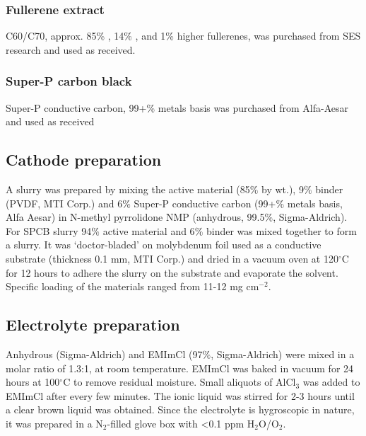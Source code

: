\documentclass{article}
\begin{document}
\subsubsection*{Fullerene extract}
C60/C70, approx. 85\% , 14\% , and 1\% higher fullerenes, was purchased from SES research and used as received.
\subsubsection*{Super-P carbon black}
Super-P conductive carbon, 99+\% metals basis was purchased from Alfa-Aesar and used as received


\subsection{Cathode preparation}
A slurry was prepared by mixing the active material (85$\%$ by wt.), 9$\%$ binder (PVDF, MTI Corp.) and 6$\%$ Super-P conductive carbon (99+$\%$ metals basis, Alfa Aesar) in N-methyl pyrrolidone NMP (anhydrous, 99.5$\%$, Sigma-Aldrich). For SPCB slurry 94$\%$ active material and 6$\%$ binder was mixed together to form a slurry. It was ‘doctor-bladed’ on molybdenum foil used as a conductive substrate (thickness 0.1 mm, MTI Corp.) and dried in a vacuum oven at 120$^{\circ}$C for 12 hours to adhere the slurry on the substrate and evaporate the solvent. Specific loading of the materials ranged from 11-12 mg cm$^{-2}$. 

\subsection{Electrolyte preparation}
Anhydrous  (Sigma-Aldrich) and EMImCl (97$\%$, Sigma-Aldrich) were mixed in a molar ratio of 1.3:1, at room temperature. EMImCl was baked in vacuum for 24 hours at 100$^{\circ}$C to remove residual moisture. Small aliquots of AlCl$_3$ was added to EMImCl after every few minutes. The ionic liquid was stirred for 2-3 hours until a clear brown liquid was obtained. Since the electrolyte is hygroscopic in nature, it was prepared in a N$_2$-filled glove box with <0.1 ppm H$_2$O/O$_2$. 
\end{document}
